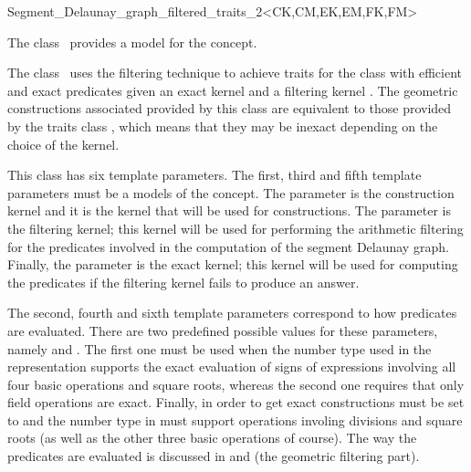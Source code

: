 


\begin{ccRefClass}
{Segment_Delaunay_graph_filtered_traits_2<CK,CM,EK,EM,FK,FM>}


\ccDefinition
  
The class \ccRefName\ provides a model for the
 concept.

The class \ccRefName\ uses the filtering technique \cite{cgal:bbp-iayed-01}
to achieve traits for the 
class with efficient and exact predicates given an exact
kernel  and a filtering kernel . The geometric
constructions associated provided by this class are equivalent
to those provided by the traits class
, which means that
they may be inexact depending on the choice of the  kernel.

This class has six template parameters. The first, third and fifth
template parameters must be a models of the  concept. The
parameter  is the construction kernel and it is the kernel
that will be used for constructions. The parameter  is the
filtering kernel; this kernel will be used for performing the
arithmetic filtering for the predicates involved in the computation of
the segment Delaunay graph. Finally, the parameter  is the
exact kernel; this kernel will be used for computing the predicates if
the filtering kernel fails to produce an answer.

The second, fourth and sixth template parameters correspond to how
predicates are evaluated. There are two predefined possible values for
these parameters, namely  and
. The first one must be used when the number type
used in the representation supports the exact evaluation of signs of
expressions involving all four basic operations and square roots,
whereas the second one requires that only field operations are
exact. Finally, in order to get exact constructions 
must be set to  and the number type in
 must support operations involing divisions and square roots
(as well as the other three basic operations of course).
%
The way the predicates are evaluated is discussed in
\cite{b-ecvdl-96} and \cite{cgal:k-reisv-04} (the geometric filtering
part).


\end{ccRefClass}
